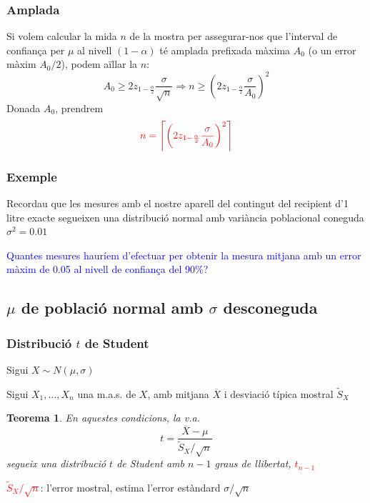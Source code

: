\documentclass[12pt,t]{beamer}
\newcommand{\red}[1]{\textcolor{red}{#1}}
\newcommand{\blue}[1]{\textcolor{blue}{#1}}
\renewcommand{\emph}[1]{{\color{red}#1}}
\renewcommand{\geq}{\geqslant}
\theoremstyle{plain}
\newtheorem{teorema}{Teorema}
\theoremstyle{definition}
\begin{document}
\begin{frame}
\frametitle{Amplada}

Si volem calcular la mida $n$ de la mostra per assegurar-nos que l'interval
de confiança per $\mu$ al nivell $(1-\alpha)$ té amplada prefixada màxima $A_0$ (o un
error màxim $A_0/2$), podem aïllar la $n$:
$$
A_0\geq 2z_{1-\frac{\alpha}{2}}\frac{\sigma}{\sqrt{n}}\Rightarrow
n\geq \left( 2 z_{1-\frac{\alpha}{2}}\frac{\sigma}{A_0}
\right)^2
$$
Donada $A_0$, prendrem
$$
\red{n=\left\lceil \left( 2 z_{1-\frac{\alpha}{2}}\frac{\sigma}{A_0}
\right)^2\right\rceil}
$$

\end{frame}


\begin{frame}
\frametitle{Exemple}

Recordau que les mesures amb el nostre aparell del contingut del recipient  d'1 litre exacte
segueixen una distribució normal amb variància poblacional coneguda $\sigma^2=0.01$
\medskip

\blue{Quantes mesures hauríem d'efectuar per obtenir la mesura mitjana amb un error màxim de 0.05 al nivell de confiança del 90\%?}




\end{frame}



\subsection{$\mu$ de població normal amb $\sigma$ desconeguda}

\begin{frame}
\frametitle{Distribució $t$ de Student}


Sigui $X\sim N(\mu,\sigma)$
\medskip

Sigui $X_1,\ldots,X_n$ una m.a.s. de $X$, amb mitjana $\overline{X}$ i desviació típica mostral $\widetilde{S}_{X}$
\medskip

\begin{teorema}
En aquestes condicions, la v.a.
$$
t=\frac{\overline{X}-\mu}{\widetilde{S}_{X}/\sqrt{n}}
$$
segueix una distribució \emph{$t$ de Student} amb $n-1$ graus de llibertat, \red{$t_{n-1}$}
\end{teorema}
\medskip

\red{$\widetilde{S}_{X}/\sqrt{n}$}: l'\emph{error mostral}, estima l'error estàndard $\sigma/\sqrt{n}$


\end{frame}
\end{document}
